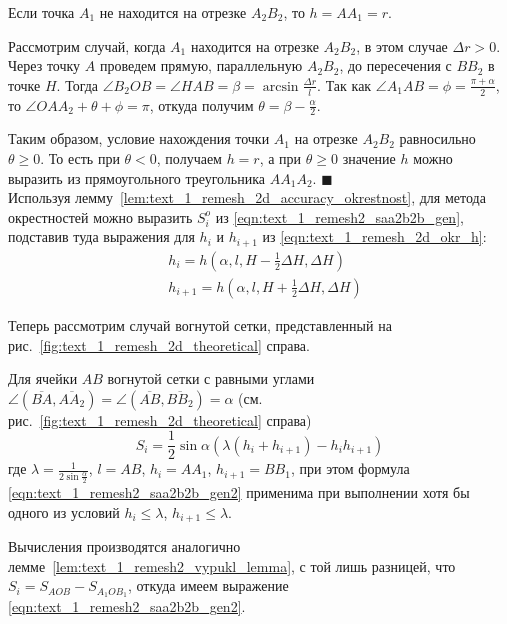 \documentclass[
11pt,%
tightenlines,%
twoside,%
onecolumn,%
nofloats,%
nobibnotes,%
nofootinbib,%
superscriptaddress,%
noshowpacs,%
centertags]%
{revtex4}
\begin{document}
Если точка $A_1$ не находится на отрезке $A_2B_2$, то $h = AA_1 = r$.

Рассмотрим случай, когда $A_1$ находится на отрезке $A_2B_2$, в этом случае $\Delta r > 0$.
Через точку $A$ проведем прямую, параллельную $A_2B_2$, до пересечения с $BB_2$ в точке $H$.
Тогда $\angle B_2OB = \angle HAB = \beta = \arcsin \frac{\Delta r}{l}$.
Так как $\angle A_1AB = \phi = \frac{\pi + \alpha}{2}$, то $\angle OAA_2 + \theta + \phi = \pi$, откуда получим $\theta = \beta - \frac{\alpha}{2}$.

Таким образом, условие нахождения точки $A_1$ на отрезке $A_2B_2$ равносильно $\theta \ge 0$.
То есть при $\theta < 0$, получаем $h = r$, а при $\theta \ge 0$ значение $h$ можно выразить из прямоугольного треугольника $AA_1A_2$.
$\blacksquare$\\

Используя лемму~\ref{lem:text_1_remesh_2d_accuracy_okrestnost}, для метода окрестностей можно выразить $S_i^o$ из \eqref{eqn:text_1_remesh2_saa2b2b_gen}, подставив туда выражения для $h_i$ и $h_{i + 1}$ из \eqref{eqn:text_1_remesh_2d_okr_h}:
\begin{equation}
	\begin{aligned}
	& h_i = h \left( \alpha, l, H - \frac{1}{2}\Delta H, \Delta H \right) \\
	& h_{i + 1} = h \left( \alpha, l, H + \frac{1}{2}\Delta H, \Delta H \right)
	\end{aligned}
\end{equation}

Теперь рассмотрим случай вогнутой сетки, представленный на рис.~\ref{fig:text_1_remesh_2d_theoretical} справа.

\begin{lemma}
Для ячейки $AB$ вогнутой сетки с равными углами $\angle (\overline{BA}, \overline{AA_2}) = \angle (\overline{AB}, \overline{BB_2}) = \alpha$ (см. рис.~\ref{fig:text_1_remesh_2d_theoretical} справа)
\begin{equation}\label{eqn:text_1_remesh2_saa2b2b_gen2}
S_i = \frac{1}{2} \sin \alpha \left( \lambda(h_i + h_{i+1}) - h_ih_{i+1} \right)
\end{equation}
где $\lambda = \frac{1}{2 \sin \frac{\alpha}{2}}$, $l = AB$, $h_i = AA_1$, $h_{i + 1} = BB_1$, при этом формула \eqref{eqn:text_1_remesh2_saa2b2b_gen2} применима при выполнении хотя бы одного из условий $h_i \le \lambda$, $h_{i+1} \le \lambda$.
\end{lemma}

Вычисления производятся аналогично лемме~\ref{lem:text_1_remesh2_vypukl_lemma}, с той лишь разницей, что $S_i = S_{AOB} - S_{A_1OB_1}$, откуда имеем выражение \eqref{eqn:text_1_remesh2_saa2b2b_gen2}.
\end{document}
